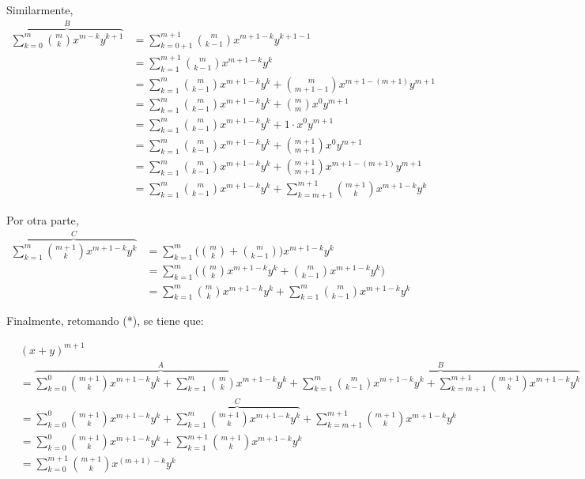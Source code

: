   Similarmente,  
  \begin{align*}
    \overbrace{\sum_{k=0}^{m} \binom{m}{k} x^{m-k}y^{k+1}}^{B} &= \sum_{k=0+1}^{m+1} \binom{m}{k-1} x^{m+1-k}y^{k+1-1}\\
    &= \sum_{k=1}^{m+1} \binom{m}{k-1} x^{m+1-k}y^{k}\\
    &= \sum_{k=1}^{m} \binom{m}{k-1} x^{m+1-k}y^{k} + \binom{m}{m+1-1} x^{m+1-(m+1)}y^{m+1}\\
    &=  \sum_{k=1}^{m} \binom{m}{k-1} x^{m+1-k}y^{k} + \binom{m}{m} x^{0}y^{m+1}\\
    &=  \sum_{k=1}^{m} \binom{m}{k-1} x^{m+1-k}y^{k} + 1\cdot x^{0}y^{m+1}\\
    &= \sum_{k=1}^{m} \binom{m}{k-1} x^{m+1-k}y^{k} + \binom{m+1}{m+1} x^{0}y^{m+1}\\
    &= \sum_{k=1}^{m} \binom{m}{k-1} x^{m+1-k}y^{k} + \binom{m+1}{m+1} x^{m+1-(m+1)}y^{m+1}\\
    &= \sum_{k=1}^{m} \binom{m}{k-1} x^{m+1-k}y^{k} + \sum_{k=m+1}^{m+1} \binom{m+1}{k} x^{m+1-k} y^k
  \end{align*}
  
  Por otra parte,
  \begin{align*}
    \overbrace{\sum_{k=1}^{m} \binom{m+1}{k} x^{m+1-k}y^{k}}^{C} &= \sum_{k=1}^{m} \Biggl(\binom{m}{k} + \binom{m}{k-1}\Biggr) x^{m+1-k}y^k\\
    &= \sum_{k=1}^{m} \Biggl(\binom{m}{k} x^{m+1-k}y^k + \binom{m}{k-1} x^{m+1-k}y^{k}\Biggr)\\
    &= \sum_{k=1}^{m} \binom{m}{k} x^{m+1-k}y^k + \sum_{k=1}^{m} \binom{m}{k-1} x^{m+1-k}y^{k}
  \end{align*}
  
\pagebreak
  
  Finalmente, retomando (*), se tiene que:
  
  \begin{align*}
   &(x+y)^{m+1}\\
   &= \overbrace{\sum_{k=0}^{0} \binom{m+1}{k} x^{m+1-k}y^k +\sum_{k=1}^{m} \binom{m}{k} x^{m+1-k}y^k}^{A} + \overbrace{\sum_{k=1}^{m} \binom{m}{k-1} x^{m+1-k}y^{k} + \sum_{k=m+1}^{m+1} \binom{m+1}{k} x^{m+1-k} y^k}^{B}\\
    &= \sum_{k=0}^{0} \binom{m+1}{k} x^{m+1-k}y^k + \overbrace{\sum_{k=1}^{m} \binom{m+1}{k} x^{m+1-k}y^{k}}^{C} + \sum_{k=m+1}^{m+1} \binom{m+1}{k} x^{m+1-k} y^k\\
    &= \sum_{k=0}^{0} \binom{m+1}{k} x^{m+1-k}y^k + \sum_{k=1}^{m+1} \binom{m+1}{k} x^{m+1-k} y^k\\
    &= \sum_{k=0}^{m+1} \binom{m+1}{k} x^{(m+1)-k} y^k
  \end{align*}
  
